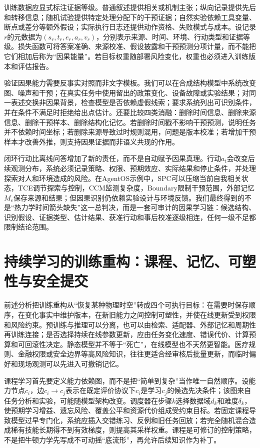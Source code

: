 训练数据应显式标注证据等级。普通叙述提供相关或机制主张；纵向记录提供先后和转移信息；随机试验提供特定处理分配下的干预证据；自然实验依赖工具变量、断点或差分等额外假设；实际执行日志还提供动作资格、失败模式与成本。设记录$r$的元数据为$(s_r,t_r,e_r,a_r,v_r)$，分别表示来源、时间、环境、行动类型和证据等级。损失函数可将答案准确、来源校准、假设披露和干预预测分项计量，而不能把它们相加后称为“因果能量”。若目标权重随部署风险变化，权重也必须进入训练版本和评估报告。

验证因果能力需要反事实对照而非文字模板。我们可以在合成结构模型中系统改变图、噪声和干预；在真实任务中使用留出的政策变化、设备故障或实验结果；对同一表述交换非因果背景，检查模型是否依赖虚假线索；要求系统列出可识别条件，并在条件不满足时拒绝给出点估计。还要比较四类消融：删除时间信息、删除来源信息、删除干预样本、删除结构化记忆。若删除时间戳不影响干预预测，说明任务并不依赖时间坐标；若删除来源导致过时规则混用，问题是版本校准；若增加干预样本才改善外推，则支持因果证据而非语义共现的作用。

闭环行动比离线问答增加了新的责任，而不是自动赋予因果真理。行动$a_t$会改变后续观测分布，系统必须记录策略、权限、预期效应、实际结果和停止条件，并处理探索对人和环境造成的风险。在AgentOS示例中，SPC可以压缩当前自我相关状态，TCE调节探索与控制，CCM监测复杂度，Boundary限制干预范围，外部记忆$M_e$保存来源和结果；但因果识别仍依赖实验设计与环境反馈。我们最终得到的不是“热力学时间箭头缺失”这一总判决，而是一套可审计的因果学习链：候选结构、识别假设、证据类型、估计结果、获准行动和事后校准逐级相连，任何一级不足都限制结论范围。

\section{持续学习的训练重构：课程、记忆、可塑性与安全提交}
\label{sec:reconstructing_training_for_class_v}

前述分析把训练重构从“恢复某种物理时空”转成四个可执行目标：在需要时保存顺序，在变化事实中维护版本，在新旧能力之间控制可塑性，并使在线更新受到权限和风险约束。预训练与推理可以分离，也可以由检索、适配器、外部记忆和周期性再训练连接；是否选择持续在线参数更新，应由任务变化速度、错误代价、计算预算和可回滚性决定。静态模型并不等于“死亡”，在线模型也不天然更智能。医疗规则、金融权限或安全边界等高风险知识，往往更适合经审核后批量更新，而临时偏好和现场观测可以先进入可撤销记忆。

课程学习首先要定义能力依赖图，而不是把“简单到复杂”当作唯一自然顺序。设能力节点$c_i$，边$c_i\rightarrow c_j$表示在既定评价协议下$c_i$是学习$c_j$的候选先决条件；该图来自任务分析和实验，可能随模型架构改变。调度器在步骤$k$选择数据域$d_k$和难度$\delta_k$，使预期学习增益、遗忘风险、覆盖公平和资源代价组成受约束目标。若固定课程导致模型过早专门化，系统应插入交错练习、反例和旧任务回放；若完全随机混合造成稀有技能长期得不到有效梯度，则提高其采样权重。课程是可修订的控制策略，不是把牛顿力学先写成不可动摇“底流形”，再允许后续知识作为补丁。

